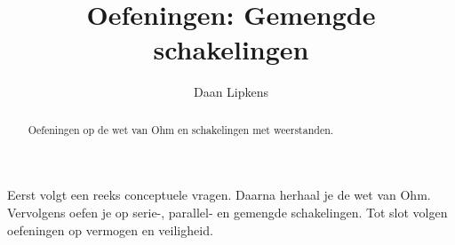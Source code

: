 \documentclass{ximera}
\title{Oefeningen: Gemengde schakelingen}
\author{Daan Lipkens}
\begin{document}
\begin{abstract}
    Oefeningen op de wet van Ohm en schakelingen met weerstanden.
\end{abstract}
\maketitle

Eerst volgt een reeks conceptuele vragen. Daarna herhaal je de wet van Ohm. Vervolgens oefen je op serie-, parallel- en gemengde schakelingen. Tot slot volgen oefeningen op vermogen en veiligheid.
\end{document}
